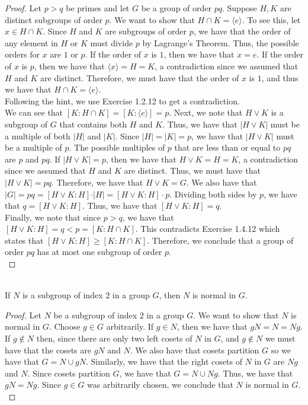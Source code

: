 \documentclass{article}
\begin{document}
\begin{proof}
    Let $p > q$ be primes and let $G$ be a group of order $pq$. Suppose $H,K$ are distinct subgroups of order $p$. We want to show that $H \cap K = \langle e \rangle$. To see this, let $x \in H \cap K$. Since $H$ and $K$ are subgroups of order $p$, we have that the order of any element in $H$ or $K$ must divide $p$ by Lagrange's Theorem. Thus, the possible orders for $x$ are $1$ or $p$. If the order of $x$ is $1$, then we have that $x = e$. If the order of $x$ is $p$, then we have that $\langle x \rangle = H = K$, a contradiction since we assumed that $H$ and $K$ are distinct. Therefore, we must have that the order of $x$ is $1$, and thus we have that $H \cap K = \langle e \rangle$. \\
    Following the hint, we use Exercise 1.2.12 to get a contradiction. \\
    We can see that $[K : H \cap K] = [K : \langle e \rangle] = p$. Next, we note that $H \vee K$ is a subgroup of $G$ that contains both $H$ and $K$. Thus, we have that $|H \vee K|$ must be a multiple of both $|H|$ and $|K|$. Since $|H| = |K| = p$, we have that $|H \vee K|$ must be a multiple of $p$. The possible multiples of $p$ that are less than or equal to $pq$ are $p$ and $pq$. If $|H \vee K| = p$, then we have that $H \vee K = H = K$, a contradiction since we assumed that $H$ and $K$ are distinct. Thus, we must have that $|H \vee K| = pq$. Therefore, we have that $H \vee K = G$. We also have that $\vert G \vert = pq = [H \vee K : H] \cdot \vert H \vert = [H \vee K : H] \cdot p$. Dividing both sides by $p$, we have that $q = [H \vee K : H]$. Thus, we have that $[H \vee K : H] = q$. \\
    Finally, we note that since $p > q$, we have that $[H \vee K : H] = q < p = [K : H \cap K]$. This contradicts Exercise 1.4.12 which states that $[H \vee K : H] \geq [K : H \cap K]$. Therefore, we conclude that a group of order $pq$ has at most one subgroup of order $p$. \\
\end{proof}


 \newpage
\begin{problem}[Exercise 1.5.1] \\
    If $N$ is a subgroup of index $2$ in a group $G$, then $N$ is normal in $G$.
\end{problem}


\begin{proof}
    Let $N$ be a subgroup of index $2$ in a group $G$. We want to show that $N$ is normal in $G$. Choose $g \in G$ arbitrarily. If $g \in N$, then we have that $gN = N = Ng$. If $g \notin N$ then, since there are only two left cosets of $N$ in $G$, and $g \notin N$ we must have that the cosets are $gN$ and $N$. We also have that cosets partition $G$ so we have that $G = N \cup gN$. Similarly, we have that the right cosets of $N$ in $G$ are $Ng$ and $N$. Since cosets partition $G$, we have that $G = N \cup Ng$. Thus, we have that $gN = Ng$. Since $g \in G$ was arbitrarily chosen, we conclude that $N$ is normal in $G$. \\
\end{proof}
\end{document}
